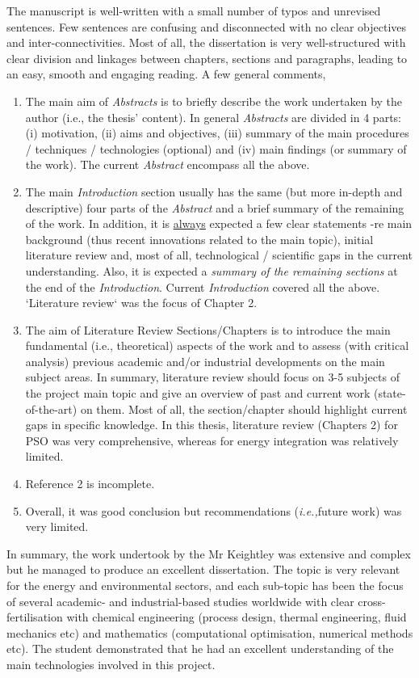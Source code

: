 \documentclass[14pt,twoside]{report}
\newcommand{\ie}{{\it i.e.,}}
\begin{document}
The manuscript is well-written with a small number of typos and unrevised sentences. Few sentences are confusing and disconnected with no clear objectives and inter-connectivities. Most of all, the dissertation is very well-structured with clear division and linkages between chapters, sections and paragraphs, leading to an easy, smooth and engaging reading. A few general comments,
\begin{enumerate}
%
\item The main aim of {\it Abstracts} is to briefly describe the work undertaken by the author (i.e., the thesis' content). In general {\it Abstracts} are divided in 4 parts: (i) motivation, (ii) aims and objectives, (iii) summary of the main procedures / techniques / technologies (optional) and (iv) main findings (or summary of the work). The current {\it Abstract} encompass all the above.
%
\item The main {\it Introduction} section usually has the same (but more in-depth and descriptive) four parts of the {\it Abstract} and a brief summary of the remaining of the work. In addition, it is \underline{always} expected a few clear statements -re main background (thus recent innovations related to the main topic), initial literature review and, most of all, technological / scientific gaps in the current understanding. Also, it is expected a {\it summary of the remaining sections} at the end of the {\it Introduction}.  Current {\it Introduction} covered all the above. `Literature review` was the focus of Chapter 2.
%
\item The aim of Literature Review Sections/Chapters is to introduce the main fundamental (i.e., theoretical) aspects of the work and to assess (with critical analysis) previous academic and/or industrial developments on the main subject areas. In summary, literature review should focus on 3-5 subjects of the project main topic and give an overview of past and current work (state-of-the-art) on them. Most of all, the section/chapter should highlight current gaps in specific knowledge. In this thesis, literature review (Chapters 2) for PSO was very comprehensive, whereas for energy integration was relatively limited. 
%
\item Reference 2 is incomplete.
%
\item Overall, it was good conclusion but recommendations (\ie future work) was very limited.
% 
\end{enumerate}
In summary, the work undertook by the Mr Keightley was extensive and complex but he managed to produce an excellent dissertation. The topic is very relevant for the energy and environmental sectors, and each sub-topic has been the focus of several academic- and industrial-based studies worldwide with clear cross-fertilisation with chemical engineering (process design, thermal engineering, fluid mechanics etc) and mathematics (computational optimisation, numerical methods etc). The student demonstrated that he had an excellent understanding of the main technologies involved in this project.
\end{document}
